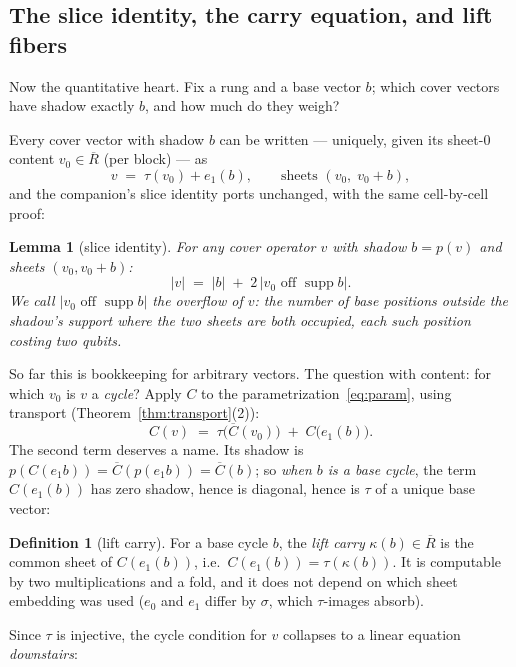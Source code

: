 \documentclass[11pt]{article}
\theoremstyle{plain}
\newtheorem{lemma}[theorem]{Lemma}
\theoremstyle{definition}
\newtheorem{definition}[theorem]{Definition}
\theoremstyle{remark}
\newcommand{\suppop}{\operatorname{supp}}
\newcommand{\Rbase}{\overline{R}}
\newcommand{\wt}[1]{\lvert #1\rvert}
\newcommand{\ov}[1]{\overline{#1}}
\begin{document}
\subsection{The slice identity, the carry equation, and lift fibers}
\label{sec:slicecarry}

Now the quantitative heart. Fix a rung and a base vector $b$; which cover
vectors have shadow exactly $b$, and how much do they weigh?

Every cover vector with shadow $b$ can be written --- uniquely, given its
sheet-0 content $v_0 \in \Rbase$ (per block) --- as
\begin{equation}\label{eq:param}
v \;=\; \tau(v_0) + e_1(b),
\qquad\text{sheets } (v_0,\; v_0 + b),
\end{equation}
and the companion's slice identity ports unchanged, with the same
cell-by-cell proof:

\begin{lemma}[slice identity]\label{lem:slice}
For any cover operator $v$ with shadow $b = p(v)$ and sheets
$(v_0, v_0 + b)$:
\[
\wt{v} \;=\; \wt{b} \;+\; 2\,\wt{v_0 \text{ off } \suppop b} .
\]
We call $\wt{v_0 \text{ off } \suppop b}$ the \emph{overflow} of $v$: the
number of base positions outside the shadow's support where the two sheets
are \emph{both} occupied, each such position costing two qubits.
\end{lemma}

So far this is bookkeeping for arbitrary vectors. The question with
content: for which $v_0$ is $v$ a \emph{cycle}? Apply $C$ to the
parametrization~\eqref{eq:param}, using transport
(Theorem~\ref{thm:transport}(2)):
\[
C(v) \;=\; \tau\bigl(\ov C(v_0)\bigr) \;+\; C\bigl(e_1(b)\bigr).
\]
The second term deserves a name. Its shadow is $p(C(e_1 b)) =
\ov C(p(e_1 b)) = \ov C(b)$; so \emph{when $b$ is a base cycle}, the term
$C(e_1(b))$ has zero shadow, hence is diagonal, hence is $\tau$ of a
unique base vector:

\begin{definition}[lift carry]\label{def:liftcarry}
For a base cycle $b$, the \emph{lift carry} $\kappa(b) \in \Rbase$ is the
common sheet of $C(e_1(b))$, i.e.\ $C(e_1(b)) = \tau(\kappa(b))$. It is
computable by two multiplications and a fold, and it does not depend on
which sheet embedding was used ($e_0$ and $e_1$ differ by $\sigma$, which
$\tau$-images absorb).
\end{definition}

Since $\tau$ is injective, the cycle condition for $v$ collapses to a
linear equation \emph{downstairs}:
\end{document}

